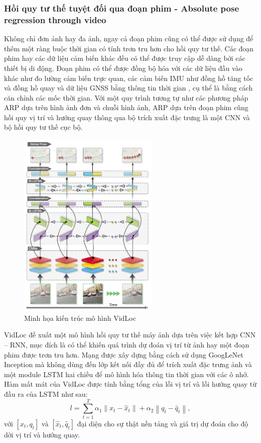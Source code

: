 \subsubsection*{Hồi quy tư thế tuyệt đối qua đoạn phim - Absolute pose regression through video}

Không chỉ đơn ảnh hay đa ảnh, ngay cả đoạn phim cũng có thể được sử dụng để thêm một ràng buộc thời gian có tính trơn tru hơn cho hồi quy tư thế. Các đoạn phim hay các dữ liệu cảm biến khác đều có thể được truy cập dễ dàng bởi các thiết bị di động. Đoạn phim có thể được đồng bộ hóa với các dữ liệu đầu vào khác như đo lường cảm biến trực quan, các cảm biến IMU như đồng hồ tăng tốc và đồng hồ quay và dữ liệu GNSS bằng thông tin thời gian , cụ thể là bằng cách căn chỉnh các mốc thời gian. Với một quy trình tương tự như các phương pháp ARP dựa trên hình ảnh đơn và chuỗi hình ảnh, ARP dựa trên đoạn phim cũng hồi quy vị trí và hướng quay thông qua bộ trích xuất đặc trưng là một CNN và bộ hồi quy tư thế cục bộ.
\begin{figure}[t]
    \centering
    \includegraphics[width=0.6\textwidth]{pics/Chapter2/vidloc.png}
    \caption{Minh họa kiến trúc mô hình VidLoc \cite{clark2017vidloc}}
\end{figure}
VidLoc \cite{clark2017vidloc} đề xuất một mô hình hồi quy tư thế máy ảnh dựa trên việc kết hợp CNN – RNN, mục đích là có thể khiến quá trình dự đoán vị trí từ ảnh hay một đoạn phim được trơn tru hơn. Mạng được xây dựng bằng cách sử dụng GoogLeNet Inception \cite{szegedy2014going} mà không dùng đến lớp kết nối đầy đủ để trích xuất đặc trưng ảnh và một module LSTM hai chiều để mô hình hóa thông tin thời gian với các ô nhớ.  Hàm mất mát của VidLoc được tính bằng tổng của lỗi vị trí và lỗi hướng quay từ đầu ra của LSTM như sau:
\begin{equation}
    l = \sum_{t=1}^T \alpha_1 \left \| x_t - \hat{x}_t \right \| + \alpha_2 \left \| q_t - \hat{q}_t \right \|,
\end{equation}
với $[x_t, q_t]$ và $[\hat{x}_t, \hat{q}_t]$ đại diện cho sự thật nền tảng và giá trị dự đoán cho độ dời vị trí và hướng quay.

